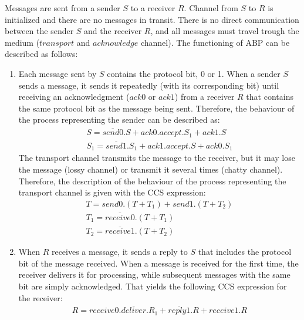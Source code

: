 Messages are sent from a sender $S$ to a receiver $R$. Channel from $S$ to $R$ is initialized and there are no messages in transit. There is no direct communication between the sender $S$ and the receiver $R$, and all messages must travel trough the medium ($transport$ and $acknowledge$ channel). The functioning of ABP can be described as follows:
\begin{enumerate}
	\item Each message sent by $S$ contains the protocol bit, 0 or 1. When a sender $S$ sends a message, it sends it repeatedly (with its corresponding bit) until receiving an acknowledgment ($ack0$ or $ack1$) from a receiver $R$ that contains the same protocol bit as the message being sent. Therefore, the behaviour of the process representing the sender can be described as:
				\begin{equation*}\label{send_imp}
				    \begin{array}{lcl}
							S = \overline{send0}.S+ack0.accept.S_{1}+ack1.S \\
							S_{1}=\overline{send1}.S_{1}+ack1.accept.S+ack0.S_{1}				  
						\end{array}
				\end{equation*}
	      The transport channel transmits the message to the receiver, but it may lose the message (lossy channel) or transmit it several times (chatty channel). Therefore, the description of the behaviour of the process representing the transport channel is given with the CCS expression:
	      \begin{equation*}\label{trans_imp}
	      	\begin{array}{lcl}
						T=send0.\left(T+T_{1}\right)+send1.\left(T+T_{2}\right)\\
						T_{1}=\overline{receive0}.\left(T+T_{1}\right)\\
						T_{2}=\overline{receive1}.\left(T+T_{2}\right)
					\end{array}
				\end{equation*}
  \item When $R$ receives a message, it sends a reply to $S$ that includes the protocol bit of the message received. When a message is received for the first time, the receiver delivers it for processing, while subsequent messages with the same bit are simply acknowledged. That yields the following CCS expression for the receiver:
  			\begin{equation*}\label{rec_imp}
				    \begin{array}{lcl}
							R=receive0.\overline{deliver}.R_{1}+\overline{reply1}.R+receive1.R \\

\end{array}
\end{equation*}
\end{enumerate}
